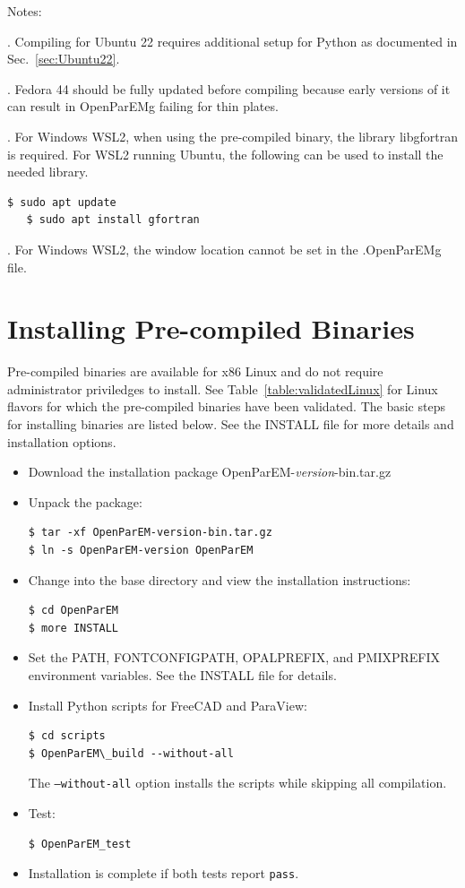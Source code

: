 \documentclass[titlepage]{article}
\renewcommand\_{\textunderscore\linebreak[1]}
\begin{document}
\noindent Notes:

. Compiling for Ubuntu 22 requires additional setup for Python as documented in Sec.~\ref{sec:Ubuntu22}.

. Fedora 44 should be fully updated before compiling because early versions of it can result in OpenParEMg failing for thin plates.

. For Windows WSL2, when using the pre-compiled binary, the library libgfortran is required.  For WSL2 running Ubuntu, the following can be used to install the needed library.
\begin{Verbatim}[fontsize=\small]
   $ sudo apt update
   $ sudo apt install gfortran
\end{Verbatim}

. For Windows WSL2, the window location cannot be set in the .OpenParEMg file.


\section{Installing Pre-compiled Binaries}

Pre-compiled binaries are available for x86 Linux and do not require administrator priviledges to install. See Table~\ref{table:validatedLinux} for Linux flavors for which the pre-compiled binaries have been validated.
The basic steps for installing binaries are listed below.  See the INSTALL file for more details and installation options.
\begin{itemize}[nosep]
   \item Download the installation package OpenParEM-\textit{version}-bin.tar.gz
   \item Unpack the package:
         \begin{Verbatim}
$ tar -xf OpenParEM-version-bin.tar.gz
$ ln -s OpenParEM-version OpenParEM
         \end{Verbatim}
   \item Change into the base directory and view the installation instructions:
         \begin{Verbatim}
$ cd OpenParEM
$ more INSTALL
         \end{Verbatim}
   \item Set the PATH, FONTCONFIG\_PATH, OPAL\_PREFIX, and PMIX\_PREFIX environment variables.  See the INSTALL file for details.
   \item Install Python scripts for FreeCAD and ParaView:
         \begin{Verbatim}
$ cd scripts
$ OpenParEM\_build --without-all
         \end{Verbatim}
         The \texttt{--without-all} option installs the scripts while skipping all compilation.
   \item Test:
         \begin{Verbatim}
$ OpenParEM_test
         \end{Verbatim}
   \item Installation is complete if both tests report \texttt{pass}.
\end{itemize}
\end{document}
